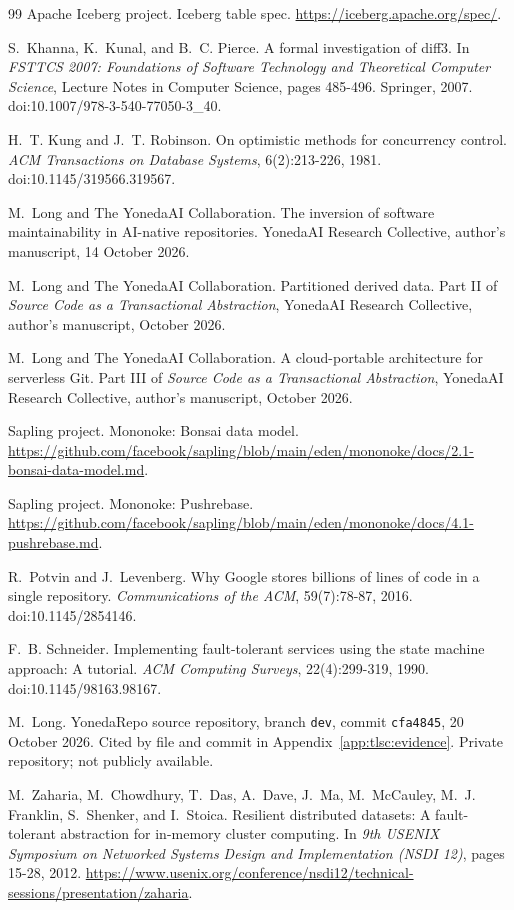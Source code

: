 \documentclass[11pt,letterpaper]{article}
\theoremstyle{definition}
\theoremstyle{remark}
\begin{document}
\begin{thebibliography}{99}
Apache Iceberg project.
Iceberg table spec.
\url{https://iceberg.apache.org/spec/}.

S.~Khanna, K.~Kunal, and B.~C. Pierce.
A formal investigation of diff3.
In \emph{FSTTCS 2007: Foundations of Software Technology and Theoretical Computer Science}, Lecture Notes in Computer Science, pages 485-496. Springer, 2007.
doi:10.1007/978-3-540-77050-3\_40.

H.~T. Kung and J.~T. Robinson.
On optimistic methods for concurrency control.
\emph{ACM Transactions on Database Systems}, 6(2):213-226, 1981.
doi:10.1145/319566.319567.

M.~Long and The YonedaAI Collaboration.
The inversion of software maintainability in AI-native repositories.
YonedaAI Research Collective, author's manuscript, 14 October 2026.

M.~Long and The YonedaAI Collaboration.
Partitioned derived data.
Part II of \emph{Source Code as a Transactional Abstraction}, YonedaAI Research Collective, author's manuscript, October 2026.

M.~Long and The YonedaAI Collaboration.
A cloud-portable architecture for serverless Git.
Part III of \emph{Source Code as a Transactional Abstraction}, YonedaAI Research Collective, author's manuscript, October 2026.

Sapling project.
Mononoke: Bonsai data model.
\url{https://github.com/facebook/sapling/blob/main/eden/mononoke/docs/2.1-bonsai-data-model.md}.

Sapling project.
Mononoke: Pushrebase.
\url{https://github.com/facebook/sapling/blob/main/eden/mononoke/docs/4.1-pushrebase.md}.

R.~Potvin and J.~Levenberg.
Why Google stores billions of lines of code in a single repository.
\emph{Communications of the ACM}, 59(7):78-87, 2016.
doi:10.1145/2854146.

F.~B. Schneider.
Implementing fault-tolerant services using the state machine approach: A tutorial.
\emph{ACM Computing Surveys}, 22(4):299-319, 1990.
doi:10.1145/98163.98167.

M.~Long.
YonedaRepo source repository, branch \texttt{dev}, commit \texttt{cfa4845}, 20 October 2026.
Cited by file and commit in Appendix~\ref{app:tlsc:evidence}.
Private repository; not publicly available.

M.~Zaharia, M.~Chowdhury, T.~Das, A.~Dave, J.~Ma, M.~McCauley, M.~J. Franklin, S.~Shenker, and I.~Stoica.
Resilient distributed datasets: A fault-tolerant abstraction for in-memory cluster computing.
In \emph{9th USENIX Symposium on Networked Systems Design and Implementation (NSDI 12)}, pages 15-28, 2012.
\url{https://www.usenix.org/conference/nsdi12/technical-sessions/presentation/zaharia}.

\end{thebibliography}
\end{document}
